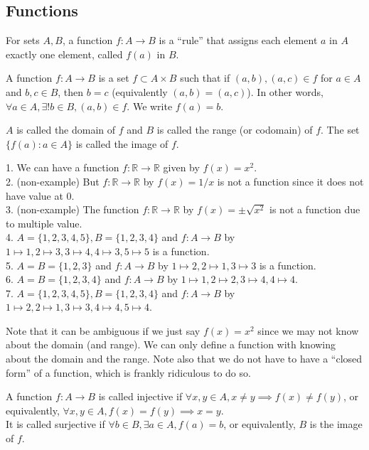 \subsection{Functions}
\begin{definition}
    For sets $A,B$, a function $f:A\to B$ is a ``rule'' that assigns each element $a$ in $A$ exactly one element, called $f(a)$ in $B$.
\end{definition}
\begin{definition}
    A function $f:A\to B$ is a set $f\subset A\times B$ such that if $(a,b),(a,c)\in f$ for $a\in A$ and $b,c\in B$, then $b=c$ (equivalently $(a,b)=(a,c)$).
    In other words, $\forall a\in A,\exists!b\in B,(a,b)\in f$.
    We write $f(a)=b$.
\end{definition}
$A$ is called the domain of $f$ and $B$ is called the range (or codomain) of $f$.
The set $\{f(a):a\in A\}$ is called the image of $f$.
\begin{example}
    1. We can have a function $f:\mathbb R\to\mathbb R$ given by $f(x)=x^2$.\\
    2. (non-example) But $f:\mathbb R\to\mathbb R$ by $f(x)=1/x$ is not a function since it does not have value at $0$.\\
    3. (non-example) The function $f:\mathbb R\to\mathbb R$ by $f(x)=\pm\sqrt{x^2}$ is not a function due to multiple value.\\
    4. $A=\{1,2,3,4,5\},B=\{1,2,3,4\}$ and $f:A\to B$ by $1\mapsto 1,2\mapsto 3,3\mapsto 4,4\mapsto 3,5\mapsto 5$ is a function.\\
    5. $A=B=\{1,2,3\}$ and $f:A\to B$ by $1\mapsto 2,2\mapsto 1,3\mapsto 3$ is a function.\\
    6. $A=B=\{1,2,3,4\}$ and $f:A\to B$ by $1\mapsto 1,2\mapsto 2,3\mapsto 4,4\mapsto 4$.\\
    7. $A=\{1,2,3,4,5\}, B=\{1,2,3,4\}$ and $f:A\to B$ by $1\mapsto 2,2\mapsto 1,3\mapsto 3,4\mapsto 4,5\mapsto 4$.
\end{example}
Note that it can be ambiguous if we just say $f(x)=x^2$ since we may not know about the domain (and range).
We can only define a function with knowing about the domain and the range.
Note also that we do not have to have a ``closed form'' of a function, which is frankly ridiculous to do so.
\begin{definition}
    A function $f:A\to B$ is called injective if $\forall x,y\in A,x\neq y\implies f(x)\neq f(y)$, or equivalently, $\forall x,y\in A,f(x)=f(y)\implies x=y$.\\
    It is called surjective if $\forall b\in B,\exists a\in A,f(a)=b$, or equivalently, $B$ is the image of $f$.
\end{definition}
